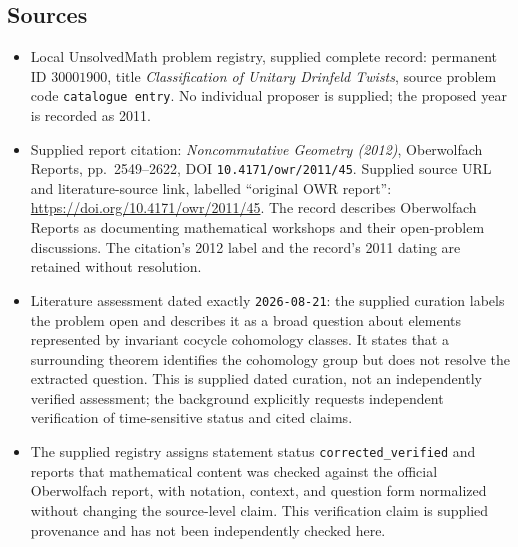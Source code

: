 \documentclass[11pt]{article}
\begin{document}
\subsection{Sources}
\begin{itemize}
\item Local UnsolvedMath problem registry, supplied complete record: permanent ID \(30001900\), title \emph{Classification of Unitary Drinfeld Twists}, source problem code \texttt{catalogue entry}. No individual proposer is supplied; the proposed year is recorded as 2011.
\item Supplied report citation: \emph{Noncommutative Geometry (2012)}, Oberwolfach Reports, pp.\ 2549--2622, DOI \texttt{10.4171/owr/2011/45}. Supplied source URL and literature-source link, labelled ``original OWR report'': \url{https://doi.org/10.4171/owr/2011/45}. The record describes Oberwolfach Reports as documenting mathematical workshops and their open-problem discussions. The citation's 2012 label and the record's 2011 dating are retained without resolution.
\item Literature assessment dated exactly \texttt{2026-08-21}: the supplied curation labels the problem open and describes it as a broad question about elements represented by invariant cocycle cohomology classes. It states that a surrounding theorem identifies the cohomology group but does not resolve the extracted question. This is supplied dated curation, not an independently verified assessment; the background explicitly requests independent verification of time-sensitive status and cited claims.
\item The supplied registry assigns statement status \texttt{corrected\_verified} and reports that mathematical content was checked against the official Oberwolfach report, with notation, context, and question form normalized without changing the source-level claim. This verification claim is supplied provenance and has not been independently checked here.
\end{itemize}
\end{document}
